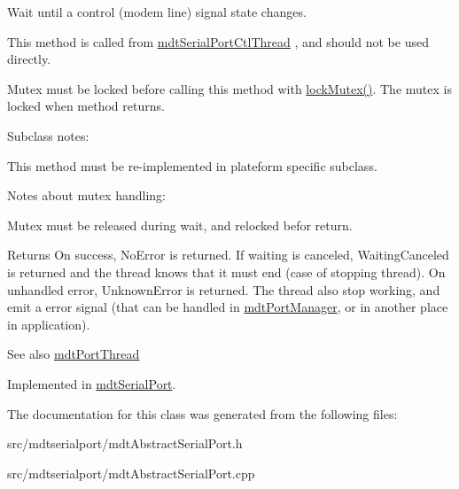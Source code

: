 Wait until a control (modem line) signal state changes. 

This method is called from \hyperlink{classmdt_serial_port_ctl_thread}{mdtSerialPortCtlThread} , and should not be used directly.\par
 Mutex must be locked before calling this method with \hyperlink{classmdt_abstract_port_a6bf2ecdcf894da3929a22eb8793a9fe3}{lockMutex()}. The mutex is locked when method returns.

Subclass notes:\par
 This method must be re-\/implemented in plateform specific subclass.\par
 Notes about mutex handling:
\begin{DoxyItemize}
\item Mutex must be released during wait, and relocked befor return.
\end{DoxyItemize}

\begin{DoxyReturn}{Returns}
On success, NoError is returned. If waiting is canceled, WaitingCanceled is returned and the thread knows that it must end (case of stopping thread). On unhandled error, UnknownError is returned. The thread also stop working, and emit a error signal (that can be handled in \hyperlink{classmdt_port_manager}{mdtPortManager}, or in another place in application).
\end{DoxyReturn}
\begin{DoxySeeAlso}{See also}
\hyperlink{classmdt_port_thread}{mdtPortThread} 
\end{DoxySeeAlso}


Implemented in \hyperlink{classmdt_serial_port_a9d1402c229401343a3bf66eeda4fe9da}{mdtSerialPort}.



The documentation for this class was generated from the following files:\begin{DoxyCompactItemize}
\item 
src/mdtserialport/mdtAbstractSerialPort.h\item 
src/mdtserialport/mdtAbstractSerialPort.cpp\end{DoxyCompactItemize}
